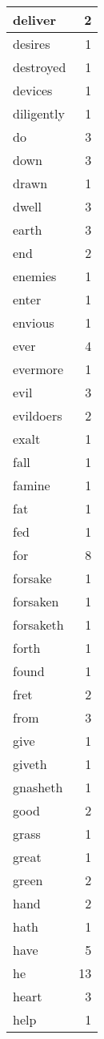 \begin{center}
\begin{longtable}{l|r}
deliver & 2 \\ \hline
desires & 1 \\ \hline
destroyed & 1 \\ \hline
devices & 1 \\ \hline
diligently & 1 \\ \hline
do & 3 \\ \hline
down & 3 \\ \hline
drawn & 1 \\ \hline
dwell & 3 \\ \hline
earth & 3 \\ \hline
end & 2 \\ \hline
enemies & 1 \\ \hline
enter & 1 \\ \hline
envious & 1 \\ \hline
ever & 4 \\ \hline
evermore & 1 \\ \hline
evil & 3 \\ \hline
evildoers & 2 \\ \hline
exalt & 1 \\ \hline
fall & 1 \\ \hline
famine & 1 \\ \hline
fat & 1 \\ \hline
fed & 1 \\ \hline
for & 8 \\ \hline
forsake & 1 \\ \hline
forsaken & 1 \\ \hline
forsaketh & 1 \\ \hline
forth & 1 \\ \hline
found & 1 \\ \hline
fret & 2 \\ \hline
from & 3 \\ \hline
give & 1 \\ \hline
giveth & 1 \\ \hline
gnasheth & 1 \\ \hline
good & 2 \\ \hline
grass & 1 \\ \hline
great & 1 \\ \hline
green & 2 \\ \hline
hand & 2 \\ \hline
hath & 1 \\ \hline
have & 5 \\ \hline
he & 13 \\ \hline
heart & 3 \\ \hline
help & 1 \\ \hline

\end{longtable}
\end{center}
